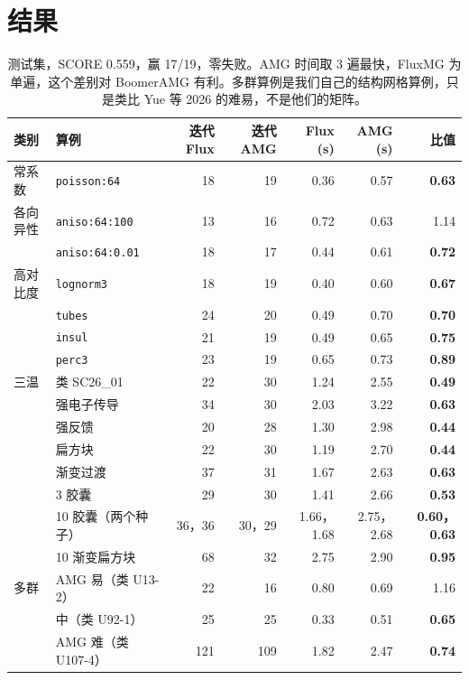\documentclass[11pt,a4paper]{ctexart}
\begin{document}
\section{结果}
\begin{table}[H]
\centering\footnotesize\setlength{\tabcolsep}{4pt}
\begin{tabular}{llrrrrr}
\toprule
类别 & 算例 & 迭代 Flux & 迭代 AMG & Flux (s) & AMG (s) & 比值 \\
\midrule
常系数 & \texttt{poisson:64} & 18 & 19 & 0.36 & 0.57 & \textbf{0.63} \\
各向异性 & \texttt{aniso:64:100} & 13 & 16 & 0.72 & 0.63 & 1.14 \\
 & \texttt{aniso:64:0.01} & 18 & 17 & 0.44 & 0.61 & \textbf{0.72} \\
高对比度 & \texttt{lognorm3} & 18 & 19 & 0.40 & 0.60 & \textbf{0.67} \\
 & \texttt{tubes} & 24 & 20 & 0.49 & 0.70 & \textbf{0.70} \\
 & \texttt{insul} & 21 & 19 & 0.49 & 0.65 & \textbf{0.75} \\
 & \texttt{perc3} & 23 & 19 & 0.65 & 0.73 & \textbf{0.89} \\
三温 & 类 SC26\_01 & 22 & 30 & 1.24 & 2.55 & \textbf{0.49} \\
 & 强电子传导 & 34 & 30 & 2.03 & 3.22 & \textbf{0.63} \\
 & 强反馈 & 20 & 28 & 1.30 & 2.98 & \textbf{0.44} \\
 & 扁方块 & 22 & 30 & 1.19 & 2.70 & \textbf{0.44} \\
 & 渐变过渡 & 37 & 31 & 1.67 & 2.63 & \textbf{0.63} \\
 & 3 胶囊 & 29 & 30 & 1.41 & 2.66 & \textbf{0.53} \\
 & 10 胶囊（两个种子） & 36，36 & 30，29 & 1.66，1.68 & 2.75，2.68 & \textbf{0.60，0.63} \\
 & 10 渐变扁方块 & 68 & 32 & 2.75 & 2.90 & \textbf{0.95} \\
多群 & AMG 易（类 U13-2） & 22 & 16 & 0.80 & 0.69 & 1.16 \\
 & 中（类 U92-1） & 25 & 25 & 0.33 & 0.51 & \textbf{0.65} \\
 & AMG 难（类 U107-4） & 121 & 109 & 1.82 & 2.47 & \textbf{0.74} \\
\bottomrule
\end{tabular}
\caption{测试集，SCORE 0.559，赢 17/19，零失败。AMG 时间取 3 遍最快，FluxMG 为单遍，这个差别对 BoomerAMG 有利。多群算例是我们自己的结构网格算例，只是类比 Yue 等 2026 的难易，不是他们的矩阵。}
\end{table}
\end{document}
